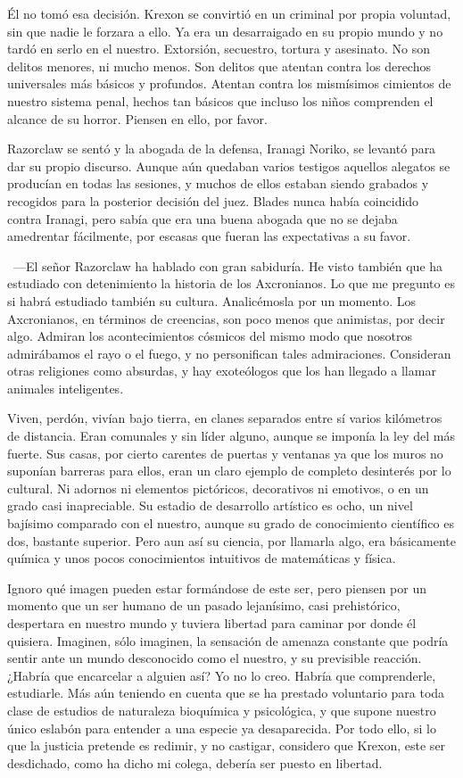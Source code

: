 \rquoti Él no tomó esa decisión. Krexon se convirtió en un criminal por propia voluntad, sin que nadie le forzara a ello. Ya era un desarraigado en su propio mundo y no tardó en serlo en el nuestro. Extorsión, secuestro, tortura y asesinato. No son delitos menores, ni mucho menos. Son delitos que atentan contra los derechos universales más básicos y profundos. Atentan contra los mismísimos cimientos de nuestro sistema penal, hechos tan básicos que incluso los niños comprenden el alcance de su horror. Piensen en ello, por favor.

Razorclaw se sentó y la abogada de la defensa, Iranagi Noriko, se levantó para dar su propio discurso. Aunque aún quedaban varios testigos aquellos alegatos se producían en todas las sesiones, y muchos de ellos estaban siendo grabados y recogidos para la posterior decisión del juez. Blades nunca había coincidido contra Iranagi, pero sabía que era una buena abogada que no se dejaba amedrentar fácilmente, por escasas que fueran las expectativas a su favor.

~---El señor Razorclaw ha hablado con gran sabiduría. He visto también que ha estudiado con detenimiento la historia de los Axcronianos. Lo que me pregunto es si habrá estudiado también su cultura. Analicémosla por un momento. Los Axcronianos, en términos de creencias, son poco menos que animistas, por decir algo. Admiran los acontecimientos cósmicos del mismo modo que nosotros admirábamos el rayo o el fuego, y no personifican tales admiraciones. Consideran otras religiones como absurdas, y hay exoteólogos que los han llegado a llamar animales inteligentes.

\rquoti Viven, perdón, vivían bajo tierra, en clanes separados entre sí varios kilómetros de distancia. Eran comunales y sin líder alguno, aunque se imponía la ley del más fuerte. Sus casas, por cierto carentes de puertas y ventanas ya que los muros no suponían barreras para ellos, eran un claro ejemplo de completo desinterés por lo cultural. Ni adornos ni elementos pictóricos, decorativos ni emotivos, o en un grado casi inapreciable. Su estadio de desarrollo artístico es ocho, un nivel bajísimo comparado con el nuestro, aunque su grado de conocimiento científico es dos, bastante superior. Pero aun así su ciencia, por llamarla algo, era básicamente química y unos pocos conocimientos intuitivos de matemáticas y física.

\rquoti Ignoro qué imagen pueden estar formándose de este ser, pero piensen por un momento que un ser humano de un pasado lejanísimo, casi prehistórico, despertara en nuestro mundo y tuviera libertad para caminar por donde él quisiera. Imaginen, sólo imaginen, la sensación de amenaza constante que podría sentir ante un mundo desconocido como el nuestro, y su previsible reacción. ¿Habría que encarcelar a alguien así? Yo no lo creo. Habría que comprenderle, estudiarle. Más aún teniendo en cuenta que se ha prestado voluntario para toda clase de estudios de naturaleza bioquímica y psicológica, y que supone nuestro único eslabón para entender a una especie ya desaparecida. Por todo ello, si lo que la justicia pretende es redimir, y no castigar, considero que Krexon, este ser desdichado, como ha dicho mi colega, debería ser puesto en libertad.

